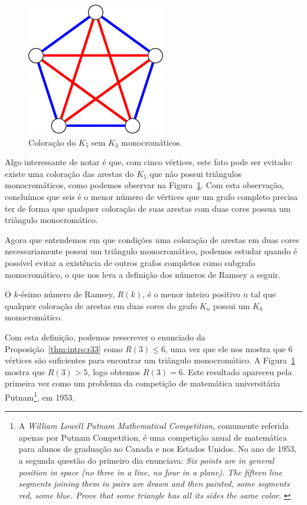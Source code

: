 \begin{figure}[ht!]
\centering
\includegraphics{figures/1_intro_5_pentagram}
\caption{Coloração do $K_5$ sem $K_3$ monocromáticos.}
\label{fig:intro:r33lb}
\end{figure}

Algo interessante de notar é que, com cinco vértices, este fato pode ser evitado: existe uma coloração das arestas do $K_5$ que não possui triângulos monocromáticos, como podemos observar na Figura~\ref{fig:intro:r33lb}. Com esta observação, concluímos que seis é o menor número de vértices que um grafo completo precisa ter de forma que qualquer coloração de suas arestas com duas cores possua um triângulo monocromático.

Agora que entendemos em que condições uma coloração de arestas em duas cores necessariamente possui um triângulo monocromático, podemos estudar quando é possível evitar a existência de outros grafos completos como subgrafo monocromático, o que nos leva a definição dos números de Ramsey a seguir.

\begin{definition}
O $k$-ésimo número de Ramsey, $R(k)$, é o menor inteiro positivo $n$ tal que qualquer coloração de arestas em duas cores do grafo $K_n$ possui um $K_k$ monocromático.
\end{definition}

Com esta definição, podemos reescrever o enunciado da Proposição~\ref{thm:intro:r33} como $R(3) \leq 6$, uma vez que ele nos mostra que 6 vértices são suficientes para encontrar um triângulo monocromático.  A Figura~\ref{fig:intro:r33lb} mostra que $R(3) > 5$, logo obtemos $R(3) = 6$. Este resultado apareceu pela primeira vez como um problema da competição de matemática universitária Putnam\footnote{A \emph{William Lowell Putnam Mathematical Competition}, comumente referida apenas por Putnam Competition, é uma competição anual de matemática para alunos de graduação no Canada e nos Estados Unidos. No ano de 1953, a segunda questão do primeiro dia enunciava:
\emph{Six points are in general position in space (no three in a line, no four in a plane). The fifteen line segments joining them in pairs are drawn and then painted, some segments red, some blue. Prove that some triangle has all its sides the same color.} \cite{putnam}}, em 1953.

